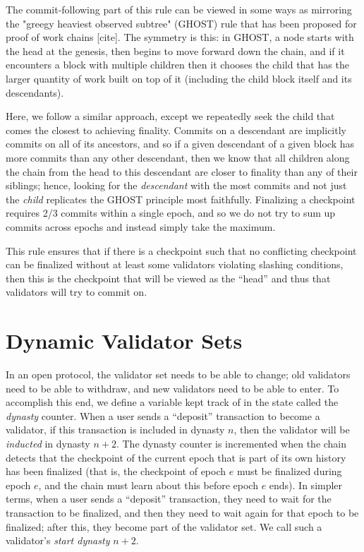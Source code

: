 \documentclass[12pt]{article}
\begin{document}
The commit-following part of this rule can be viewed in some ways as mirroring the "greegy heaviest observed subtree" (GHOST) rule that has been proposed for proof of work chains [cite]. The symmetry is this: in GHOST, a node starts with the head at the genesis, then begins to move forward down the chain, and if it encounters a block with multiple children then it chooses the child that has the larger quantity of work built on top of it (including the child block itself and its descendants).

Here, we follow a similar approach, except we repeatedly seek the child that comes the closest to achieving finality. Commits on a descendant are implicitly commits on all of its ancestors, and so if a given descendant of a given block has more commits than any other descendant, then we know that all children along the chain from the head to this descendant are closer to finality than any of their siblings; hence, looking for the \textit{descendant} with the most commits and not just the \textit{child} replicates the GHOST principle most faithfully. Finalizing a checkpoint requires 2/3 commits within a single epoch, and so we do not try to sum up commits across epochs and instead simply take the maximum.

This rule ensures that if there is a checkpoint such that no conflicting checkpoint can be finalized without at least some validators violating slashing conditions, then this is the checkpoint that will be viewed as the ``head'' and thus that validators will try to commit on.

\section{Dynamic Validator Sets}

In an open protocol, the validator set needs to be able to change; old validators need to be able to withdraw, and new validators need to be able to enter. To accomplish this end, we define a variable kept track of in the state called the \textit{dynasty} counter. When a user sends a ``deposit'' transaction to become a validator, if this transaction is included in dynasty $n$, then the validator will be \textit{inducted} in dynasty $n+2$. The dynasty counter is incremented when the chain detects that the checkpoint of the current epoch that is part of its own history has been finalized (that is, the checkpoint of epoch $e$ must be finalized during epoch $e$, and the chain must learn about this before epoch $e$ ends). In simpler terms, when a user sends a ``deposit'' transaction, they need to wait for the transaction to be finalized, and then they need to wait again for that epoch to be finalized; after this, they become part of the validator set. We call such a validator's \textit{start dynasty} $n+2$.
\end{document}
